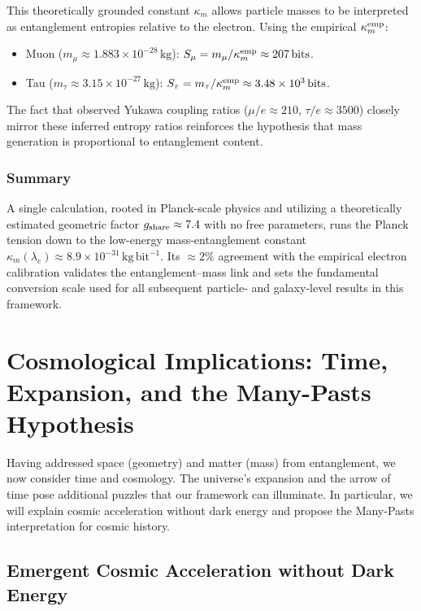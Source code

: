 \documentclass[11pt]{article}
\begin{document}
This theoretically grounded constant $\kappa_m$ allows particle masses to be interpreted as entanglement entropies relative to the electron. Using the empirical $\kappa_m^{\rm emp}$:
\begin{itemize}
    \item Muon ($m_\mu \approx 1.883 \times 10^{-28}\,\mathrm{kg}$): $S_\mu = m_\mu / \kappa_m^{\rm emp} \approx 207\,\mathrm{bits}$.
    \item Tau ($m_\tau \approx 3.15 \times 10^{-27}\,\mathrm{kg}$): $S_\tau = m_\tau / \kappa_m^{\rm emp} \approx 3.48 \times 10^3\,\mathrm{bits}$.
\end{itemize}
The fact that observed Yukawa coupling ratios ($\mu/e \approx 210$, $\tau/e \approx 3500$) closely mirror these inferred entropy ratios reinforces the hypothesis that mass generation is proportional to entanglement content.

\subsubsection{Summary}

A single calculation, rooted in Planck-scale physics and utilizing a theoretically estimated geometric factor $g_{\rm share} \approx 7.4$ with no free parameters, runs the Planck tension down to the low-energy mass-entanglement constant $\kappa_m(\lambda_e) \approx 8.9 \times 10^{-31}\,\mathrm{kg\,bit}^{-1}$. Its $\approx 2\%$ agreement with the empirical electron calibration validates the entanglement–mass link and sets the fundamental conversion scale used for all subsequent particle- and galaxy-level results in this framework.


\section{Cosmological Implications: Time, Expansion, and the Many-Pasts Hypothesis}

Having addressed space (geometry) and matter (mass) from entanglement, we now consider time and cosmology. The universe’s expansion and the arrow of time pose additional puzzles that our framework can illuminate. In particular, we will explain cosmic acceleration without dark energy and propose the Many-Pasts interpretation for cosmic history.

\subsection{Emergent Cosmic Acceleration without Dark Energy}
\end{document}
